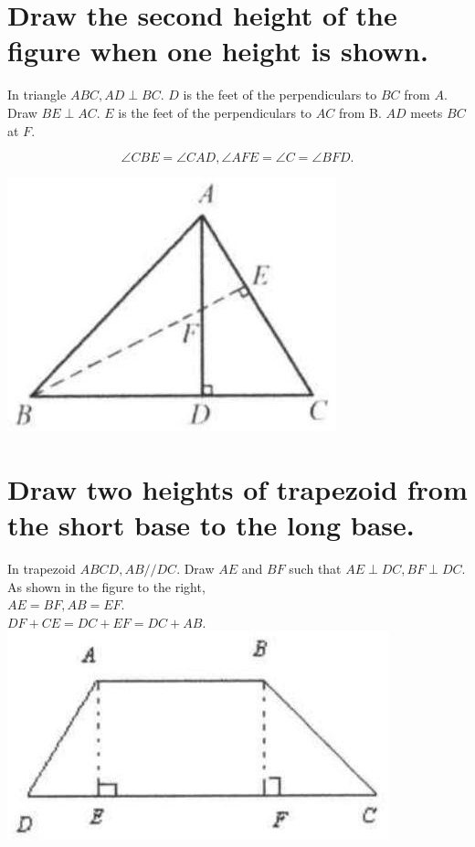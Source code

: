 \documentclass[10pt]{article}
\begin{document}
\section*{Draw the second height of the figure when one height is shown.}
In triangle \(A B C, A D \perp B C\). \(D\) is the feet of the perpendiculars to \(B C\) from \(A\). Draw \(B E \perp A C\). \(E\) is the feet of the perpendiculars to \(A C\) from B. \(A D\) meets \(B C\) at \(F\).

\[
\angle C B E=\angle C A D, \angle A F E=\angle C=\angle B F D .
\]

\begin{center}
\includegraphics[max width=\textwidth]{2025_04_17_97bc1f7e44d93c271a88g-074(3)}
\end{center}

\section*{Draw two heights of trapezoid from the short base to the long base.}
In trapezoid \(A B C D, A B / / D C\). Draw \(A E\) and \(B F\) such that \(A E \perp D C, B F \perp D C\). As shown in the figure to the right,\\
\(A E=B F, A B=E F\).\\
\(D F+C E=D C+E F=D C+A B\).\\
\includegraphics[max width=\textwidth, center]{2025_04_17_97bc1f7e44d93c271a88g-074(2)}
\end{document}
